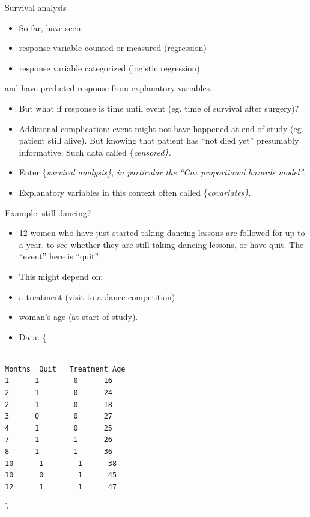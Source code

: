 \documentclass[ignorenonframetext,]{beamer}
\begin{document}
\begin{frame}{Survival analysis}
\protect\hypertarget{survival-analysis}{}

\begin{itemize}
\item
  So far, have seen:
\item
  response variable counted or measured (regression)
\item
  response variable categorized (logistic regression)
\end{itemize}

and have predicted response from explanatory variables.

\begin{itemize}
\item
  But what if response is time until event (eg. time of survival after
  surgery)?
\item
  Additional complication: event might not have happened at end of study
  (eg. patient still alive). But knowing that patient has ``not died
  yet'' presumably informative. Such data called \{\em censored\}.
\item
  Enter \{\em survival analysis\}, in particular the ``Cox proportional
  hazards model''.
\item
  Explanatory variables in this context often called \{\em covariates\}.
\end{itemize}

\end{frame}

\begin{frame}[fragile]{Example: still dancing?}
\protect\hypertarget{example-still-dancing}{}

\begin{itemize}
\item
  12 women who have just started taking dancing lessons are followed for
  up to a year, to see whether they are still taking dancing lessons, or
  have quit. The ``event'' here is ``quit''.
\item
  This might depend on:
\item
  a treatment (visit to a dance competition)
\item
  woman's age (at start of study).
\item
  Data: \{\scriptsize
\end{itemize}

\begin{verbatim}

Months  Quit   Treatment Age
1      1        0      16
2      1        0      24
2      1        0      18
3      0        0      27
4      1        0      25
7      1        1      26
8      1        1      36
10      1        1      38
10      0        1      45
12      1        1      47
\end{verbatim}

\}

\end{frame}
\end{document}
